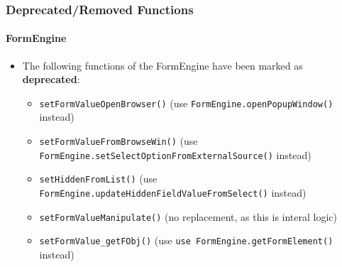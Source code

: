 
\begin{frame}[fragile]
	\frametitle{Deprecated/Removed Functions}
	\framesubtitle{FormEngine}

	\lstset{basicstyle=\tiny\ttfamily}

	\begin{itemize}
		\item The following functions of the FormEngine have been marked as \textbf{deprecated}:

			\begin{itemize}
				\item \texttt{setFormValueOpenBrowser()}\newline
					\smaller(use \texttt{FormEngine.openPopupWindow()} instead)\small

				\item \texttt{setFormValueFromBrowseWin()}\newline
					\smaller(use \texttt{FormEngine.setSelectOptionFromExternalSource()} instead)\small

				\item \texttt{setHiddenFromList()}\newline
					\smaller(use \texttt{FormEngine.updateHiddenFieldValueFromSelect()} instead)\small

				\item \texttt{setFormValueManipulate()}\newline
					\smaller(no replacement, as this is interal logic)\small

				\item \texttt{setFormValue\_getFObj()}\newline
					\smaller(use \texttt{use FormEngine.getFormElement()} instead)\small

			\end{itemize}

	\end{itemize}

\end{frame}



